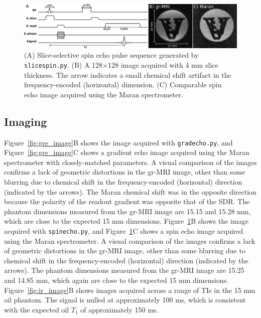 \documentclass[10pt,letterpaper]{article}
\begin{document}
\begin{figure}[h]
\begin{center}
\includegraphics[width = 1\textwidth,trim=0 0 0 0,clip=false]{SE_results.png}
\caption{{(A) Slice-selective spin echo pulse sequence generated by \texttt{slicespin.py}.
(B) A 128$\times$128 image acquired with 4 mm slice thickness. 
The arrow indicates a small chemical shift artifact in the frequency-encoded (horizontal) dimension. 
(C) Comparable spin echo image acquired using the Maran spectrometer.}}
\label{fig:se_image}
\end{center}
\end{figure}
 
\subsection*{Imaging} Figure~\ref{fig:gre_image}B shows the image acquired with \texttt{gradecho.py},
and Figure~\ref{fig:gre_image}C shows a gradient echo image acquired using the Maran spectrometer with closely-matched parameters.
A visual comparison of the images confirms a lack of geometric distortions in the gr-MRI image,
other than some blurring due to chemical shift in the frequency-encoded (horizontal) direction (indicated by the arrows). 
The Maran chemical shift was in the opposite direction because the polarity of the readout gradient was opposite that of the SDR.
The phantom dimensions measured from the gr-MRI image are 15.15 and 15.28 mm, 
which are close to the expected 15 mm dimensions.
Figure~\ref{fig:se_image}B shows the image acquired with \texttt{spinecho.py}, and
Figure~\ref{fig:se_image}C shows a spin echo image acquired using the Maran spectrometer.
A visual comparison of the images confirms a lack of geometric distortions in the gr-MRI image,
other than some blurring due to chemical shift in the frequency-encoded (horizontal) direction (indicated by the arrows).
The phantom dimensions measured from the gr-MRI image are 15.25 and 14.85 mm, 
which again are close to the expected 15 mm dimensions.
Figure~\ref{fig:ir_image}B shows images acquired across a range of TIs in the 15 mm oil phantom.  
The signal is nulled at approximately 100 ms, 
which is consistent with the expected oil $T_1$ of approximately 150 ms.
\end{document}
